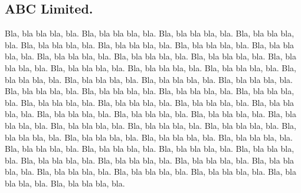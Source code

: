 \documentclass{dd}
\begin{document}
\subsection{ABC Limited.}

Bla, bla bla bla, bla.
Bla, bla bla bla, bla.
Bla, bla bla bla, bla.
Bla, bla bla bla, bla.
Bla, bla bla bla, bla.
Bla, bla bla bla, bla.
Bla, bla bla bla, bla.
Bla, bla bla bla, bla.
Bla, bla bla bla, bla.
Bla, bla bla bla, bla.
Bla, bla bla bla, bla.
Bla, bla bla bla, bla.
Bla, bla bla bla, bla.
Bla, bla bla bla, bla.
Bla, bla bla bla, bla.
Bla, bla bla bla, bla.
Bla, bla bla bla, bla.
Bla, bla bla bla, bla.
Bla, bla bla bla, bla.
Bla, bla bla bla, bla.
Bla, bla bla bla, bla.
Bla, bla bla bla, bla.
Bla, bla bla bla, bla.
Bla, bla bla bla, bla.
Bla, bla bla bla, bla.
Bla, bla bla bla, bla.
Bla, bla bla bla, bla.
Bla, bla bla bla, bla.
Bla, bla bla bla, bla.
Bla, bla bla bla, bla.
Bla, bla bla bla, bla.
Bla, bla bla bla, bla.
Bla, bla bla bla, bla.
Bla, bla bla bla, bla.
Bla, bla bla bla, bla.
Bla, bla bla bla, bla.
Bla, bla bla bla, bla.
Bla, bla bla bla, bla.
Bla, bla bla bla, bla.
Bla, bla bla bla, bla.
Bla, bla bla bla, bla.
Bla, bla bla bla, bla.
Bla, bla bla bla, bla.
Bla, bla bla bla, bla.
Bla, bla bla bla, bla.
Bla, bla bla bla, bla.
Bla, bla bla bla, bla.
Bla, bla bla bla, bla.
Bla, bla bla bla, bla.
Bla, bla bla bla, bla.
Bla, bla bla bla, bla.
\end{document}
